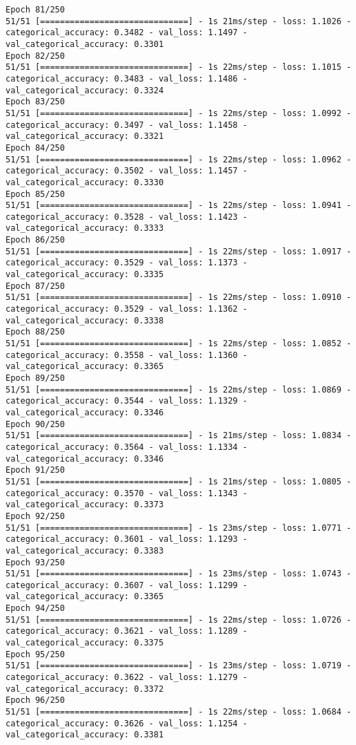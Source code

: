 \begin{lstlisting}
Epoch 81/250
51/51 [==============================] - 1s 21ms/step - loss: 1.1026 - categorical_accuracy: 0.3482 - val_loss: 1.1497 - val_categorical_accuracy: 0.3301
Epoch 82/250
51/51 [==============================] - 1s 22ms/step - loss: 1.1015 - categorical_accuracy: 0.3483 - val_loss: 1.1486 - val_categorical_accuracy: 0.3324
Epoch 83/250
51/51 [==============================] - 1s 22ms/step - loss: 1.0992 - categorical_accuracy: 0.3497 - val_loss: 1.1458 - val_categorical_accuracy: 0.3321
Epoch 84/250
51/51 [==============================] - 1s 22ms/step - loss: 1.0962 - categorical_accuracy: 0.3502 - val_loss: 1.1457 - val_categorical_accuracy: 0.3330
Epoch 85/250
51/51 [==============================] - 1s 22ms/step - loss: 1.0941 - categorical_accuracy: 0.3528 - val_loss: 1.1423 - val_categorical_accuracy: 0.3333
Epoch 86/250
51/51 [==============================] - 1s 22ms/step - loss: 1.0917 - categorical_accuracy: 0.3529 - val_loss: 1.1373 - val_categorical_accuracy: 0.3335
Epoch 87/250
51/51 [==============================] - 1s 22ms/step - loss: 1.0910 - categorical_accuracy: 0.3529 - val_loss: 1.1362 - val_categorical_accuracy: 0.3338
Epoch 88/250
51/51 [==============================] - 1s 22ms/step - loss: 1.0852 - categorical_accuracy: 0.3558 - val_loss: 1.1360 - val_categorical_accuracy: 0.3365
Epoch 89/250
51/51 [==============================] - 1s 22ms/step - loss: 1.0869 - categorical_accuracy: 0.3544 - val_loss: 1.1329 - val_categorical_accuracy: 0.3346
Epoch 90/250
51/51 [==============================] - 1s 21ms/step - loss: 1.0834 - categorical_accuracy: 0.3564 - val_loss: 1.1334 - val_categorical_accuracy: 0.3346
Epoch 91/250
51/51 [==============================] - 1s 21ms/step - loss: 1.0805 - categorical_accuracy: 0.3570 - val_loss: 1.1343 - val_categorical_accuracy: 0.3373
Epoch 92/250
51/51 [==============================] - 1s 23ms/step - loss: 1.0771 - categorical_accuracy: 0.3601 - val_loss: 1.1293 - val_categorical_accuracy: 0.3383
Epoch 93/250
51/51 [==============================] - 1s 23ms/step - loss: 1.0743 - categorical_accuracy: 0.3607 - val_loss: 1.1299 - val_categorical_accuracy: 0.3365
Epoch 94/250
51/51 [==============================] - 1s 22ms/step - loss: 1.0726 - categorical_accuracy: 0.3621 - val_loss: 1.1289 - val_categorical_accuracy: 0.3375
Epoch 95/250
51/51 [==============================] - 1s 23ms/step - loss: 1.0719 - categorical_accuracy: 0.3622 - val_loss: 1.1279 - val_categorical_accuracy: 0.3372
Epoch 96/250
51/51 [==============================] - 1s 22ms/step - loss: 1.0684 - categorical_accuracy: 0.3626 - val_loss: 1.1254 - val_categorical_accuracy: 0.3381

\end{lstlisting}
